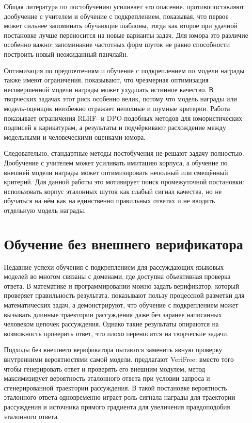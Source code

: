 Общая литература по постобучению усиливает это опасение. \citet{Chu2025} противопоставляют дообучение с учителем и обучение с подкреплением, показывая, что первое может сильнее запоминать обучающие шаблоны, тогда как второе при удачной постановке лучше переносится на новые варианты задач. Для юмора это различие особенно важно: запоминание частотных форм шуток не равно способности построить новый неожиданный панчлайн.

Оптимизация по предпочтениям и обучение с подкреплением по модели награды также имеют ограничения. \citet{Gao2023} показывают, что чрезмерная оптимизация несовершенной модели награды может ухудшать истинное качество. В творческих задачах этот риск особенно велик, потому что модель награды или модель-оценщик неизбежно отражает неполные и шумные критерии. Работа \citet{Zhang2024HumorAI} показывает ограничения RLHF- и DPO-подобных методов для юмористических подписей к карикатурам, а результаты \citet{Sakabe2025} и \citet{winters2025evaluating} подчёркивают расхождение между модельными и человеческими оценками юмора.

Следовательно, стандартные методы постобучения не решают задачу полностью. Дообучение с учителем может усиливать имитацию корпуса, а обучение по внешней модели награды может оптимизировать неполный или смещённый критерий. Для данной работы это мотивирует поиск промежуточной постановки: использовать корпус эталонных шуток как слабый сигнал качества, но не обучаться на нём как на единственно правильных ответах и не вводить отдельную модель награды.

\section{Обучение без внешнего верификатора}

Недавние успехи обучения с подкреплением для рассуждающих языковых моделей во многом связаны с доменами, где доступна объективная проверка ответа. В математике и программировании можно задать верификатор, который проверяет правильность результата. \citet{Lightman2023} показывают пользу процессной разметки для математических задач, а \citet{DeepSeek2025} демонстрируют, что обучение с подкреплением может вызывать длинные траектории рассуждения даже без заранее написанных человеком цепочек рассуждения. Однако такие результаты опираются на возможность проверить ответ, что плохо переносится на творческие задачи.

Подходы без внешнего верификатора пытаются заменить явную проверку внутренними вероятностями самой модели. \citet{Zhou2025} предлагают VeriFree: вместо того чтобы генерировать ответ и проверять его внешним модулем, метод максимизирует вероятность эталонного ответа при условии запроса и сгенерированной траектории рассуждения. В такой постановке вероятность эталонного ответа одновременно играет роль сигнала награды для траектории рассуждения и источника прямого градиента для увеличения правдоподобия эталонного ответа.

